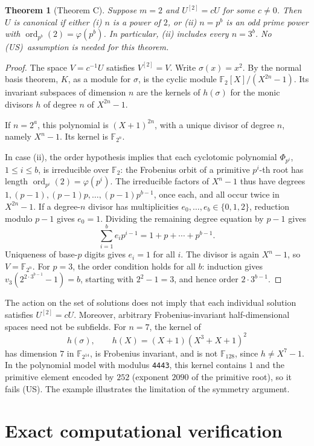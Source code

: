 \documentclass[11pt,a4paper]{article}
\newtheorem{theorem}{Theorem}[section]
\theoremstyle{definition}\newtheorem{definition}[theorem]{Definition}
\theoremstyle{remark}\newtheorem{remark}[theorem]{Remark}
\newcommand{\F}{\mathbb F}
\newcommand{\ord}{\operatorname{ord}}
\newcommand{\US}{\textup{(US)}}
\numberwithin{equation}{section}
\begin{document}
\begin{theorem}[Theorem C]\label{thm:C}
Suppose $m=2$ and $U^{[2]}=cU$ for some $c\ne0$. Then $U$ is canonical if either (i) $n$ is a power of $2$, or (ii) $n=p^b$ is an odd prime power with $\ord_{p^b}(2)=\varphi(p^b)$. In particular, (ii) includes every $n=3^b$. No \US\ assumption is needed for this theorem.
\end{theorem}
\begin{proof}
The space $V=c^{-1}U$ satisfies $V^{[2]}=V$. Write $\sigma(x)=x^2$. By the normal basis theorem, $K$, as a module for $\sigma$, is the cyclic module $\F_2[X]/(X^{2n}-1)$. Its invariant subspaces of dimension $n$ are the kernels of $h(\sigma)$ for the monic divisors $h$ of degree $n$ of $X^{2n}-1$.

If $n=2^a$, this polynomial is $(X+1)^{2n}$, with a unique divisor of degree $n$, namely $X^n-1$. Its kernel is $\F_{2^n}$.

In case (ii), the order hypothesis implies that each cyclotomic polynomial $\Phi_{p^i}$, $1\le i\le b$, is irreducible over $\F_2$: the Frobenius orbit of a primitive $p^i$-th root has length $\ord_{p^i}(2)=\varphi(p^i)$. The irreducible factors of $X^n-1$ thus have degrees $1,(p-1),(p-1)p,\ldots,(p-1)p^{b-1}$, once each, and all occur twice in $X^{2n}-1$. If a degree-$n$ divisor has multiplicities $e_0,\ldots,e_b\in\{0,1,2\}$, reduction modulo $p-1$ gives $e_0=1$. Dividing the remaining degree equation by $p-1$ gives
\[
\sum_{i=1}^b e_i p^{i-1}=1+p+\cdots+p^{b-1}.
\]
Uniqueness of base-$p$ digits gives $e_i=1$ for all $i$. The divisor is again $X^n-1$, so $V=\F_{2^n}$. For $p=3$, the order condition holds for all $b$: induction gives $v_3(2^{2\cdot3^{b-1}}-1)=b$, starting with $2^2-1=3$, and hence order $2\cdot3^{b-1}$.
\end{proof}
The action on the set of solutions does not imply that each individual solution satisfies $U^{[2]}=cU$. Moreover, arbitrary Frobenius-invariant half-dimensional spaces need not be subfields. For $n=7$, the kernel of
\[
h(\sigma),\qquad h(X)=(X+1)(X^3+X+1)^2
\]
has dimension $7$ in $\F_{2^{14}}$, is Frobenius invariant, and is not $\F_{128}$, since $h\ne X^7-1$. In the polynomial model with modulus \texttt{4443}, this kernel contains $1$ and the primitive element encoded by $252$ (exponent $2090$ of the primitive root), so it fails \US. The example illustrates the limitation of the symmetry argument.

\section{Exact computational verification}\label{sec:computation}
\end{document}
